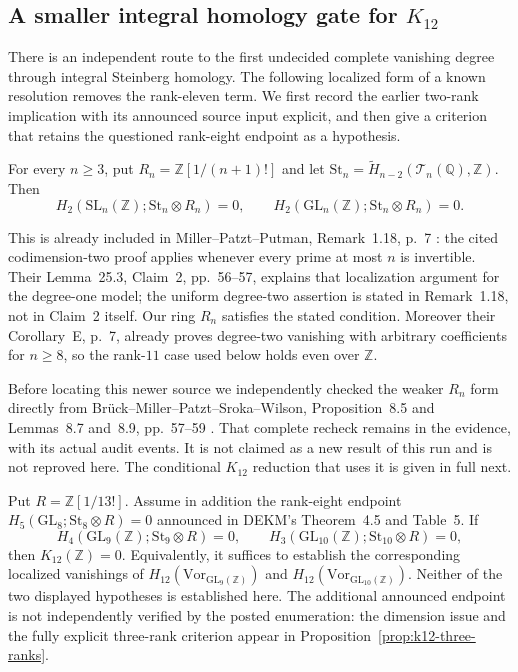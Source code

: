 \subsection{A smaller integral homology gate for \texorpdfstring{$K_{12}$}{K12}}

There is an independent route to the first undecided complete vanishing
degree through integral Steinberg homology. The following localized
form of a known resolution removes the rank-eleven term. We first
record the earlier two-rank implication with its announced source
input explicit, and then give a criterion that retains the questioned
rank-eight endpoint as a hypothesis.

\begin{sourcefact}[K17-ST2-LOCAL]\label{prop:steinberg-two-local}
For every $n\ge3$, put $R_n=\mathbb Z[1/(n+1)!]$ and let
$\mathrm{St}_n=\widetilde H_{n-2}(\mathcal T_n(\mathbb Q),\mathbb Z)$.
Then
\[
 H_2(\mathrm{SL}_n(\mathbb Z);\mathrm{St}_n\otimes R_n)=0,
 \qquad
 H_2(\mathrm{GL}_n(\mathbb Z);\mathrm{St}_n\otimes R_n)=0.
\]
\end{sourcefact}

This is already included in Miller--Patzt--Putman,
Remark~1.18, p.~7 \cite{MillerPatztPutman2025}: the cited
codimension-two proof applies whenever every prime at most $n$
is invertible. Their Lemma~25.3, Claim~2, pp.~56--57, explains
that localization argument for the degree-one model; the
uniform degree-two assertion is stated in Remark~1.18, not in
Claim~2 itself. Our ring $R_n$ satisfies the stated condition.
Moreover their Corollary~E, p.~7, already proves degree-two
vanishing with arbitrary coefficients for $n\ge8$, so the
rank-$11$ case used below holds even over $\mathbb Z$.

Before locating this newer source we independently checked the
weaker $R_n$ form directly from Br\"uck--Miller--Patzt--Sroka--Wilson,
Proposition~8.5 and Lemmas~8.7 and~8.9, pp.~57--59
\cite{BrueckEtAl2024}. That complete recheck remains in the
evidence, with its actual audit events. It is not claimed as a
new result of this run and is not reproved here. The conditional
$K_{12}$ reduction that uses it is given in full next.

\begin{proposition}\label{prop:k12-two-ranks}
Put $R=\mathbb Z[1/13!]$. Assume in addition the rank-eight endpoint
$H_5(\mathrm{GL}_8;\mathrm{St}_8\otimes R)=0$
announced in DEKM's Theorem~4.5 and Table~5. If
\[
 H_4(\mathrm{GL}_9(\mathbb Z);\mathrm{St}_9\otimes R)=0,
 \qquad
 H_3(\mathrm{GL}_{10}(\mathbb Z);\mathrm{St}_{10}\otimes R)=0,
                                                               \tag{K23}
\]
then $K_{12}(\mathbb Z)=0$.
Equivalently, it suffices to establish the corresponding localized
vanishings of $H_{12}(\mathrm{Vor}_{\mathrm{GL}_9(\mathbb Z)})$
and $H_{12}(\mathrm{Vor}_{\mathrm{GL}_{10}(\mathbb Z)})$.
Neither of the two displayed hypotheses is established here.
The additional announced endpoint is not independently verified by
the posted enumeration: the dimension issue and the fully explicit
three-rank criterion appear in Proposition~\ref{prop:k12-three-ranks}.
\end{proposition}

